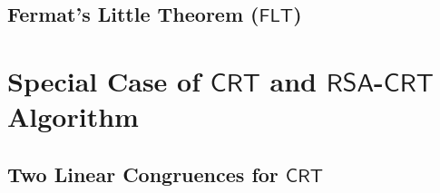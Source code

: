 \documentclass{article}
\newcommand{\rsa}{\mathsf{RSA}}
\newcommand{\inv}[1]{#1^{-1}}
\newtheorem*{theorem*}{Theorem}
\theoremstyle{definition}
\begin{document}
\subsection{Fermat's Little Theorem ($\mathsf{FLT}$)}

\newpage

\section{Special Case of $\mathsf{CRT}$ and $\rsa$-$\mathsf{CRT}$ Algorithm}

\subsection{Two Linear Congruences for $\mathsf{CRT}$}

\end{document}
